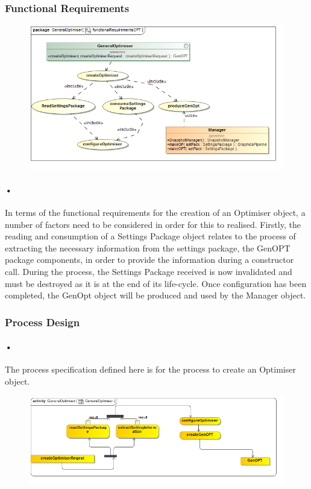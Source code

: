 \documentclass[11pt]{article}
\begin{document}
\subsubsection{Functional Requirements}
\begin{figure}[h]
\includegraphics[scale=0.5]{functionalRequirementsOPT.png}
\end{figure}

\paragraph{•}
In terms of the functional requirements for the creation of an Optimiser object, a number of factors need to be considered in order for this to realised. Firstly, the reading and consumption of a Settings Package object relates to the process of extracting the necessary information from the settings package, the GenOPT package components, in order to provide the information during a constructor call. During the process, the Settings Package received is now invalidated and must be destroyed as it is at the end of its life-cycle. Once configuration has been completed, the GenOpt object will be produced and used by the Manager object.
\subsubsection{Process Design}
\paragraph{•}
The process specification defined here is for the process to create an Optimiser object.
\begin{figure}[h]
\includegraphics[scale=0.5]{GeneralOptimiserActivity.png}
\end{figure}
\end{document}
